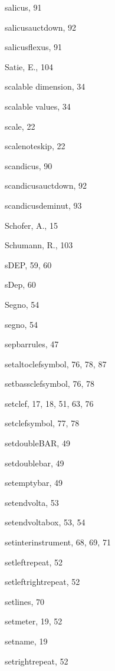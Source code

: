 \begin{theindex}
  \indexspace

  \item {\Bslash salicus}, 91
  \item {\Bslash salicusauctdown}, 92
  \item {\Bslash salicusflexus}, 91
  \item {\sc Satie, E.}, 104
  \item scalable dimension, 34
  \item scalable values, 34
  \item {\Bslash scale}, 22
  \item {\Bslash scalenoteskip}, 22
  \item {\Bslash scandicus}, 90
  \item {\Bslash scandicusauctdown}, 92
  \item {\Bslash scandicusdeminut}, 93
  \item {\sc Schofer, A.}, 15
  \item {\sc Schumann, R.}, 103
  \item {\Bslash sDEP}, 59, 60
  \item {\Bslash sDep}, 60
  \item {\Bslash Segno}, 54
  \item {\Bslash segno}, 54
  \item {\Bslash sepbarrules}, 47
  \item {\Bslash setaltoclefsymbol}, 76, 78, 87
  \item {\Bslash setbassclefsymbol}, 76, 78
  \item {\Bslash setclef}, 17, 18, 51, 63, 76
  \item {\Bslash setclefsymbol}, 77, 78
  \item {\Bslash setdoubleBAR}, 49
  \item {\Bslash setdoublebar}, 49
  \item {\Bslash setemptybar}, 49
  \item {\Bslash setendvolta}, 53
  \item {\Bslash setendvoltabox}, 53, 54
  \item {\Bslash setinterinstrument}, 68, 69, 71
  \item {\Bslash setleftrepeat}, 52
  \item {\Bslash setleftrightrepeat}, 52
  \item {\Bslash setlines}, 70
  \item {\Bslash setmeter}, 19, 52
  \item {\Bslash setname}, 19
  \item {\Bslash setrightrepeat}, 52

\end{theindex}
